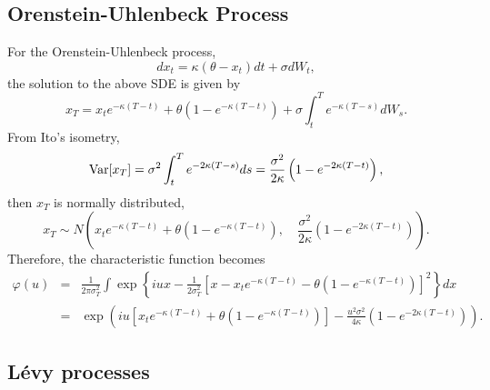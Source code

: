 \documentclass[12pt]{article}
\begin{document}
  \subsection{Orenstein-Uhlenbeck Process}

    For the Orenstein-Uhlenbeck process,
    \begin{equation}
      dx_t = \kappa\left(\theta-x_t\right)dt+\sigma dW_t,
    \end{equation}
    the solution to the above SDE is given by
    \begin{equation}
      x_T=x_te^{-\kappa(T-t)}+\theta\left(1-e^{-\kappa(T-t)}\right)+\sigma\int_t^Te^{-\kappa(T-s)}dW_s.
    \end{equation}
    From Ito's isometry,
    \begin{equation}
      {\rm Var}[x_T]=\sigma^2\int_t^Te^{-2\kappa(T-s)}ds=\frac{\sigma^2}{2\kappa}\left(1-e^{-2\kappa(T-t)}\right),
    \end{equation}
    then $x_T$ is normally distributed,
    \begin{equation}
      x_T\sim N\left(x_te^{-\kappa(T-t)}+\theta\left(1-e^{-\kappa(T-t)}\right),
                    \quad \frac{\sigma^2}{2\kappa}\left(1-e^{-2\kappa(T-t)}\right)\right).
    \end{equation}
    Therefore, the characteristic function becomes
    \begin{eqnarray}
      \varphi(u)&=&\frac{1}{2\pi\sigma_T^2}\int \exp\left\{iux-\frac{1}{2\sigma_T^2}
                      \left[x-x_te^{-\kappa(T-t)}-\theta\left(1-e^{-\kappa(T-t)}\right)\right]^2\right\}dx\nonumber\\
                &=&\exp\left(iu\left[x_te^{-\kappa(T-t)}+\theta\left(1-e^{-\kappa(T-t)}\right)\right]
                        -\frac{u^2\sigma^2}{4\kappa}\left(1-e^{-2\kappa(T-t)}\right)\right).
      \label{OU}
    \end{eqnarray}

  \subsection{L\'{e}vy processes}
\end{document}
